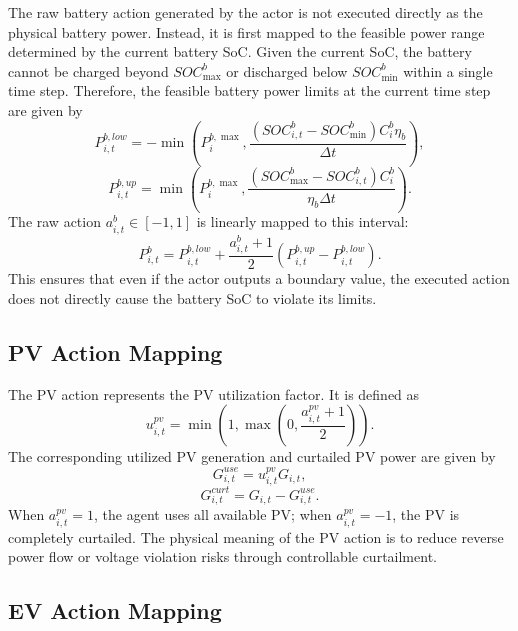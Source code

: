 The raw battery action generated by the actor is not executed directly as the physical battery power. Instead, it is first mapped to the feasible power range determined by the current battery SoC. Given the current SoC, the battery cannot be charged beyond \(SOC^b_{\max}\) or discharged below \(SOC^b_{\min}\) within a single time step. Therefore, the feasible battery power limits at the current time step are given by
\[
  P^{b,low}_{i,t}
  =
  -\min
  \left(
  P^{b,\max}_i,
  \frac{(SOC^b_{i,t}-SOC^b_{\min})C^b_i\eta_b}{\Delta t}
  \right),
\]
\[
  P^{b,up}_{i,t}
  =
  \min
  \left(
  P^{b,\max}_i,
  \frac{(SOC^b_{\max}-SOC^b_{i,t})C^b_i}{\eta_b\Delta t}
  \right).
\]
The raw action \(a^b_{i,t}\in[-1,1]\) is linearly mapped to this interval:
\[
  P^b_{i,t}
  =
  P^{b,low}_{i,t}
  +
  \frac{a^b_{i,t}+1}{2}
  (P^{b,up}_{i,t}-P^{b,low}_{i,t}).
\]
This ensures that even if the actor outputs a boundary value, the executed action does not directly cause the battery SoC to violate its limits.

\subsection{PV Action Mapping}

The PV action represents the PV utilization factor. It is defined as
\[
  u^{pv}_{i,t}
  =
  \min
  \left(
  1,\max\left(0,\frac{a^{pv}_{i,t}+1}{2}\right)
  \right).
\]
The corresponding utilized PV generation and curtailed PV power are given by
\[
  G^{use}_{i,t}=u^{pv}_{i,t}G_{i,t},
\]
\[
  G^{curt}_{i,t}=G_{i,t}-G^{use}_{i,t}.
\]
When \(a^{pv}_{i,t}=1\), the agent uses all available PV; when \(a^{pv}_{i,t}=-1\), the PV is completely curtailed. The physical meaning of the PV action is to reduce reverse power flow or voltage violation risks through controllable curtailment.

\subsection{EV Action Mapping}

